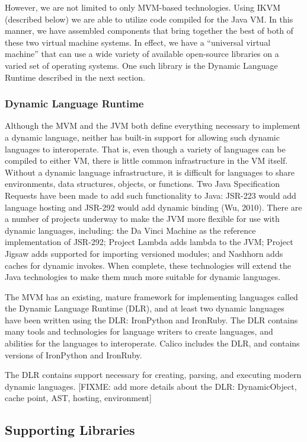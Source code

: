 \documentclass[preprint]{sigplanconf}
\begin{document}
However, we are not limited to only MVM-based technologies. Using IKVM
(described below) we are able to utilize code compiled for the Java
VM. In this manner, we have assembled components that bring together
the best of both of these two virtual machine systems. In effect, we
have a ``universal virtual machine'' that can use a wide variety of
available open-source libraries on a varied set of operating
systems. One such library is the Dynamic Language Runtime described in
the next section.

\subsubsection{Dynamic Language Runtime}

Although the MVM and the JVM both define everything necessary to
implement a dynamic language, neither has built-in support for
allowing such dynamic languages to interoperate. That is, even though
a variety of languages can be compiled to either VM, there is little
common infrastructure in the VM itself. Without a dynamic language
infrastructure, it is difficult for languages to share environments,
data structures, objects, or functions. Two Java Specification
Requests have been made to add such functionality to Java: JSR-223
would add language hosting and JSR-292 would add dynamic binding (Wu,
2010). There are a number of projects underway to make the JVM more
flexible for use with dynamic languages, including: the Da Vinci
Machine as the reference implementation of JSR-292; Project Lambda
adds lambda to the JVM; Project Jigsaw adds supported for importing
versioned modules; and Nashhorn adds caches for dynamic invokes. When
complete, these technologies will extend the Java technologies to make
them much more suitable for dynamic languages.

The MVM has an existing, mature framework for implementing languages
called the Dynamic Language Runtime (DLR), and at least two dynamic
languages have been written using the DLR: IronPython and
IronRuby. The DLR contains many tools and technologies for language
writers to create languages, and abilities for the languages to
interoperate. Calico includes the DLR, and contains versions of
IronPython and IronRuby.

The DLR contains support necessary for creating, parsing, and
executing modern dynamic languages. [FIXME: add more details about the
  DLR: DynamicObject, cache point, AST, hosting, environment]

\subsection{Supporting Libraries}
\end{document}
